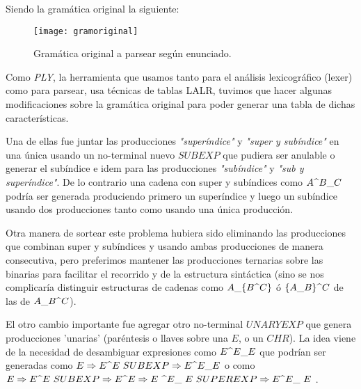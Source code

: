 Siendo la gramática original la siguiente:

\begin{figure} [ht]
    \centering
    \texttt{[image: gramoriginal]}
    \caption{Gramática original a parsear según enunciado.}
    \label{fig:gram_original}
\end{figure}

Como \emph{PLY}, la herramienta que usamos tanto para el análisis lexicográfico (lexer) como para parsear, usa técnicas de tablas LALR, tuvimos que hacer algunas modificaciones sobre la gramática original para poder generar una tabla de dichas características. \newline

Una de ellas fue juntar las producciones \emph{"superíndice"} y \emph{"super y subíndice"} en una única usando un no-terminal nuevo $SUBEXP$ que pudiera ser anulable o generar el subíndice e idem para las producciones \emph{"subíndice"} y \emph{"sub y superíndice"}. De lo contrario una cadena con super y subíndices  como $A\super B\sub C$ podría ser generada produciendo primero un superíndice y luego un subíndice usando dos producciones tanto como usando una única producción. \newline

Otra manera de sortear este problema hubiera sido eliminando las producciones que combinan super y subíndices y usando ambas producciones de manera consecutiva, pero preferimos mantener las producciones ternarias sobre las binarias para facilitar el recorrido y  de la estructura sintáctica (sino se nos complicaría distinguir estructuras de cadenas como $ A\sub \{B\super C\} $ ó $\{A\sub B\}\super C$ de las de $A\sub B\super C$). \newline

El otro cambio importante fue agregar otro no-terminal $UNARYEXP$ que genera producciones 'unarias' (paréntesis o llaves sobre una $E$, o un $CHR$). La idea viene de la necesidad de desambiguar expresiones como $E\super E\sub E$ que podrían ser generadas como $E \Rightarrow E \super  E\ SUBEXP \Rightarrow E\super E\sub E$ o como $E \Rightarrow  E \super  E\ SUBEXP \Rightarrow E \super  E \Rightarrow E\ \super  E\sub \ E\ SUPEREXP \Rightarrow E \super  E\sub \ E\ $. \newline

